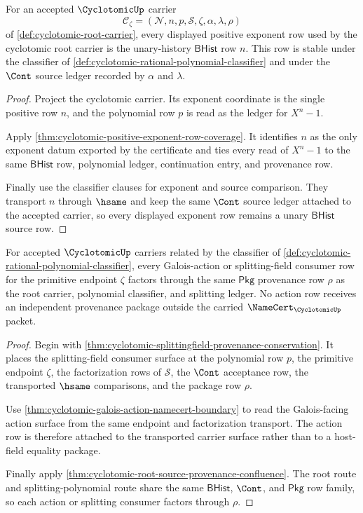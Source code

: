 \begin{theorem}
\label{thm:cyclotomic-unary-exponent-source-closure}
For an accepted $\CyclotomicUp$ carrier
$$
\mathcal{C}_{\zeta}=(\mathcal{N},n,p,\mathcal{S},\zeta,\alpha,\lambda,\rho)
$$
of \autoref{def:cyclotomic-root-carrier}, every displayed positive exponent
row used by the cyclotomic root carrier is the unary-history
$\mathsf{BHist}$ row $n$. This row is stable under the classifier of
\autoref{def:cyclotomic-rational-polynomial-classifier} and under the
$\Cont$ source ledger recorded by $\alpha$ and $\lambda$.
\end{theorem}
\begin{proof}
Project the cyclotomic carrier. Its exponent coordinate is the single positive
row $n$, and the polynomial row $p$ is read as the ledger for $X^n-1$.

Apply \autoref{thm:cyclotomic-positive-exponent-row-coverage}. It identifies
$n$ as the only exponent datum exported by the certificate and ties every read
of $X^n-1$ to the same $\mathsf{BHist}$ row, polynomial ledger, continuation
entry, and provenance row.

Finally use the classifier clauses for exponent and source comparison. They
transport $n$ through $\hsame$ and keep the same $\Cont$ source ledger attached
to the accepted carrier, so every displayed exponent row remains a unary
$\mathsf{BHist}$ source row.
\end{proof}

\begin{theorem}
\label{thm:cyclotomic-root-action-pkg-provenance}
For accepted $\CyclotomicUp$ carriers related by the classifier of
\autoref{def:cyclotomic-rational-polynomial-classifier}, every Galois-action or
splitting-field consumer row for the primitive endpoint $\zeta$ factors through
the same $\mathsf{Pkg}$ provenance row $\rho$ as the root carrier, polynomial
classifier, and splitting ledger. No action row receives an independent
provenance package outside the carried $\NameCert_{\CyclotomicUp}$ packet.
\end{theorem}
\begin{proof}
Begin with \autoref{thm:cyclotomic-splittingfield-provenance-conservation}. It
places the splitting-field consumer surface at the polynomial row $p$, the
primitive endpoint $\zeta$, the factorization rows of $\mathcal S$, the
$\Cont$ acceptance row, the transported $\hsame$ comparisons, and the package
row $\rho$.

Use \autoref{thm:cyclotomic-galois-action-namecert-boundary} to read the
Galois-facing action surface from the same endpoint and factorization
transport. The action row is therefore attached to the transported carrier
surface rather than to a host-field equality package.

Finally apply \autoref{thm:cyclotomic-root-source-provenance-confluence}. The
root route and splitting-polynomial route share the same $\mathsf{BHist}$,
$\Cont$, and $\mathsf{Pkg}$ row family, so each action or splitting consumer
factors through $\rho$.
\end{proof}


